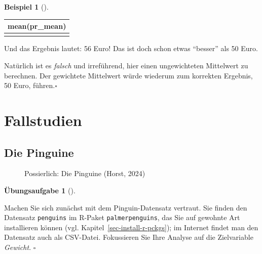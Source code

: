 \documentclass[
  letterpaper,
]{scrbook}
\theoremstyle{definition}
\newtheorem{example}{Beispiel}[chapter]
\theoremstyle{definition}
\theoremstyle{definition}
\newtheorem{exercise}{Übungsaufgabe}[chapter]
\theoremstyle{remark}
\begin{document}
\begin{example}[]
\begin{longtable}[]{@{}r@{}}
\toprule\noalign{}
mean(pr\_mean) \\
\midrule\noalign{}
\endhead
\bottomrule\noalign{}
\endlastfoot
56 \\
\end{longtable}

Und das Ergebnis lautet: 56 Euro! Das ist doch schon etwas ``besser''
als 50 Euro.

Natürlich ist es \emph{falsch} und irreführend, hier einen ungewichteten
Mittelwert zu berechnen. Der gewichtete Mittelwert würde wiederum zum
korrekten Ergebnis, 50 Euro, führen.\(\square\)

\end{example}

\section{Fallstudien}\label{fallstudien}

\subsection{Die Pinguine}\label{die-pinguine}

\begin{figure}


\caption{\label{fig-penguins}Possierlich: Die Pinguine (Horst, 2024)}

\end{figure}%

\begin{exercise}[]\protect\hypertarget{exr-peng-start}{}\label{exr-peng-start}

Machen Sie sich zunächst mit dem Pinguin-Datensatz vertraut. Sie finden
den Datensatz \texttt{penguins} im R-Paket \texttt{palmerpenguins}, das
Sie auf gewohnte Art installieren können (vgl.
Kapitel~\ref{sec-install-r-pckgs}); im Internet findet man den Datensatz
auch als CSV-Datei. Fokussieren Sie Ihre Analyse auf die Zielvariable
\emph{Gewicht}. \(\square\)

\end{exercise}
\end{document}
